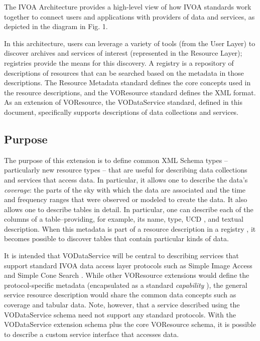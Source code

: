 \documentclass[11pt,a4paper]{ivoa}
\begin{document}
The IVOA Architecture \citep{note:VOARCH} provides a high-level
view of how IVOA standards work together to connect users and
applications with providers of data and services, as depicted in the
diagram in Fig. 1.

In this architecture, users can leverage a variety of tools (from the
User Layer) to discover archives and services of interest (represented
in the Resource Layer); registries provide the means for this
discovery.  A registry is a repository of descriptions of resources
that can be searched based on the metadata in those descriptions.  The
Resource Metadata standard \citep{RM} defines the core
concepts used in the resource descriptions, and the VOResource
standard defines the XML format.  As an
extension of VOResource, the VODataService standard, defined in this
document, specifically supports descriptions of data collections and
services.  

\subsection{Purpose}


The purpose of this extension is to define common XML Schema
types -- particularly new resource types -- that are useful for describing
data collections and services that access data.  In particular, it
allows one to describe the data's \emph{coverage}:  the parts of the
sky with which the data are associated and the time and frequency ranges that
were observed or modeled to create the data.  It also allows one to
describe tables in detail.  In particular, one can describe each of
the columns of a table--providing, for example, its name, type, UCD
\citep{UCD}, 
and textual description.  When this metadata is part of a resource
description in a registry \citep{VOR}, it becomes possible
to discover tables that contain particular kinds of data.  



It is intended that VODataService will be central to describing
services that support standard IVOA data access layer protocols such
as Simple Image Access \citep{SIA} and Simple Cone Search
\citep{SCS}.  While other VOResource extensions would
define the protocol-specific metadata (encapsulated as a standard
\emph{capability} \citep{VOR}), the general service
resource description would share the common data concepts such as
coverage and tabular data.  Note, however, that a service described
using the VODataService schema need not support any standard
protocols.  With the VODataService extension schema plus the core
VOResource schema, it is possible to describe a custom service
interface that accesses data.  
\end{document}
